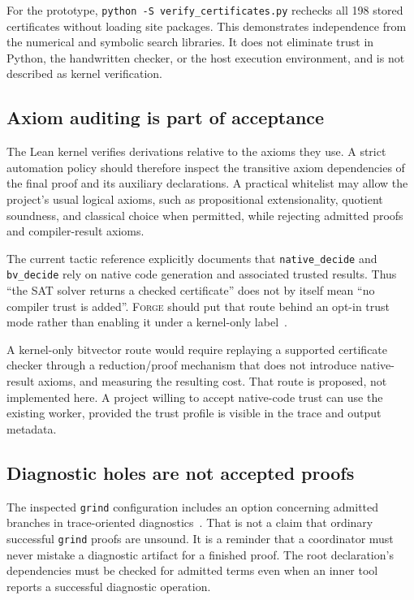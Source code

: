 \documentclass[11pt,a4paper]{article}
\theoremstyle{definition}
\newcommand{\forge}{\textsc{Forge}}
\newcommand{\grind}{\texttt{grind}}
\newcommand{\code}[1]{\texttt{#1}}
\begin{document}
For the prototype, \code{python -S verify\_certificates.py} rechecks all 198 stored certificates without loading site packages. This demonstrates independence from the numerical and symbolic search libraries. It does not eliminate trust in Python, the handwritten checker, or the host execution environment, and is not described as kernel verification.

\subsection{Axiom auditing is part of acceptance}

The Lean kernel verifies derivations relative to the axioms they use. A strict automation policy should therefore inspect the transitive axiom dependencies of the final proof and its auxiliary declarations. A practical whitelist may allow the project's usual logical axioms, such as propositional extensionality, quotient soundness, and classical choice when permitted, while rejecting admitted proofs and compiler-result axioms.

The current tactic reference explicitly documents that \code{native\_decide} and \code{bv\_decide} rely on native code generation and associated trusted results. Thus ``the SAT solver returns a checked certificate'' does not by itself mean ``no compiler trust is added''. \forge{} should put that route behind an opt-in trust mode rather than enabling it under a kernel-only label~\cite{tacticref}.

A kernel-only bitvector route would require replaying a supported certificate checker through a reduction/proof mechanism that does not introduce native-result axioms, and measuring the resulting cost. That route is proposed, not implemented here. A project willing to accept native-code trust can use the existing worker, provided the trust profile is visible in the trace and output metadata.

\subsection{Diagnostic holes are not accepted proofs}

The inspected \grind{} configuration includes an option concerning admitted branches in trace-oriented diagnostics~\cite{grindconfig}. That is not a claim that ordinary successful \grind{} proofs are unsound. It is a reminder that a coordinator must never mistake a diagnostic artifact for a finished proof. The root declaration's dependencies must be checked for admitted terms even when an inner tool reports a successful diagnostic operation.
\end{document}
